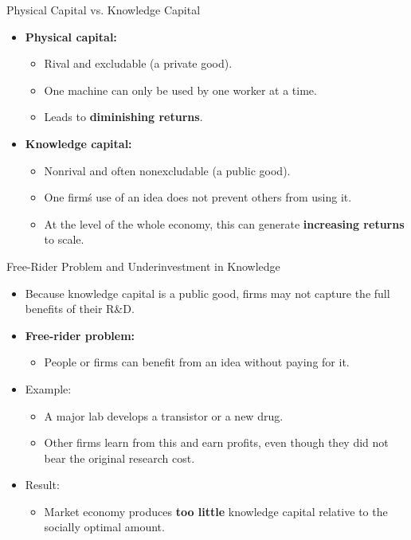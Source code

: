 \documentclass[aspectratio=169]{beamer}
\begin{document}
\begin{frame}{Physical Capital vs. Knowledge Capital}
\transfade
\begin{itemize}[<+->]
  \item \textbf{Physical capital:}
  \begin{itemize}[<+->]
    \item Rival and excludable (a private good).
    \item One machine can only be used by one worker at a time.
    \item Leads to \textbf{diminishing returns}.
  \end{itemize}
  \item \textbf{Knowledge capital:}
  \begin{itemize}[<+->]
    \item Nonrival and often nonexcludable (a public good).
    \item One firm\'s use of an idea does not prevent others from using it.
    \item At the level of the whole economy, this can generate \textbf{increasing returns} to scale.
  \end{itemize}
\end{itemize}
\end{frame}

\begin{frame}{Free-Rider Problem and Underinvestment in Knowledge}
\transfade
\begin{itemize}[<+->]
  \item Because knowledge capital is a public good, firms may not capture the full benefits of their R\&D.
  \item \textbf{Free-rider problem:}
  \begin{itemize}[<+->]
    \item People or firms can benefit from an idea without paying for it.
  \end{itemize}
  \item Example:
  \begin{itemize}[<+->]
    \item A major lab develops a transistor or a new drug.
    \item Other firms learn from this and earn profits, even though they did not bear the original research cost.
  \end{itemize}
  \item Result:
  \begin{itemize}[<+->]
    \item Market economy produces \textbf{too little} knowledge capital relative to the socially optimal amount.
  \end{itemize}
\end{itemize}
\end{frame}
\end{document}
